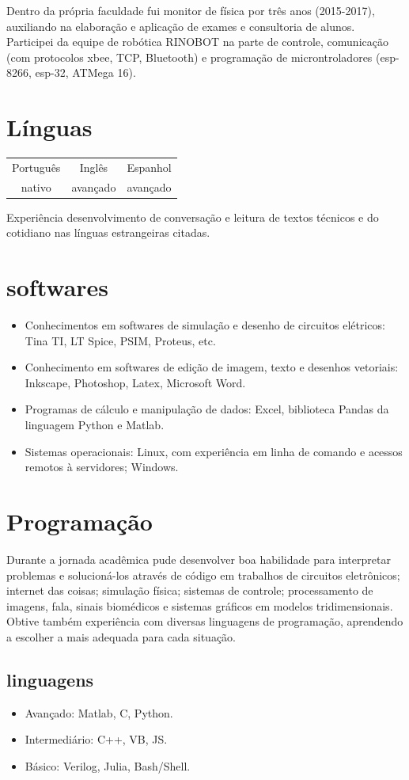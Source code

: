 \documentclass{my_cv}
\begin{document}
\begin{multicols}{2}
	Dentro da própria faculdade fui monitor de física por três anos (2015-2017), auxiliando na elaboração e aplicação de exames e consultoria de alunos. Participei da equipe de robótica RINOBOT na parte de controle, comunicação (com protocolos  xbee, TCP, Bluetooth) e programação de microntroladores (esp-8266, esp-32, ATMega 16).
	
	\section{Línguas}
	\centering
	\begin{tabular}{c|c|c}
	Português & Inglês & Espanhol \\
	nativo   & avançado& avançado \\
	\end{tabular}
	\vspace{0.5cm}
	\justify
	Experiência desenvolvimento de conversação e leitura de textos técnicos e do cotidiano nas línguas estrangeiras citadas.

	\section{softwares}
	\begin{itemize}
		
	\item Conhecimentos em softwares de simulação e desenho de circuitos elétricos: Tina  TI, LT Spice, PSIM, Proteus, etc.
	\item Conhecimento em softwares de edição de imagem, texto e desenhos vetoriais: Inkscape, Photoshop, Latex, Microsoft Word.
	\item Programas de cálculo e manipulação de dados: Excel, biblioteca Pandas da linguagem Python e Matlab.
	\item Sistemas operacionais: Linux, com experiência em linha de comando e acessos remotos à servidores; Windows.
	
	\end{itemize}

	\section{Programação}
	\justify
	Durante a jornada acadêmica pude desenvolver boa habilidade para interpretar problemas e solucioná-los através de código em trabalhos de circuitos eletrônicos; internet das coisas; simulação física; sistemas de controle; processamento de imagens, fala, sinais biomédicos e sistemas gráficos em modelos tridimensionais. Obtive também experiência com diversas linguagens de programação, aprendendo a escolher a mais adequada para cada situação. 
	
	\subsection{linguagens}
	\begin{itemize}
		\item Avançado: Matlab, C, Python.
		\item Intermediário: C++, VB, JS.
		\item Básico: Verilog, Julia, Bash/Shell.
	\end{itemize}

\end{multicols}	
\end{document}

